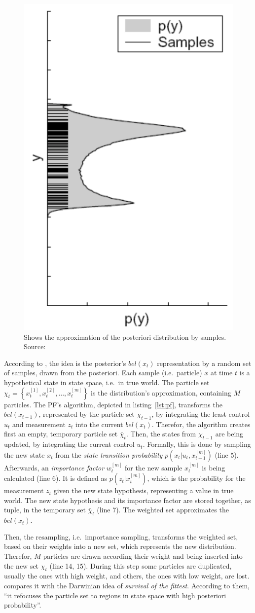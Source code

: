 \begin{figure}
	\includegraphics[height=0.45\textwidth]{figures/pf_approx}
	\caption{Shows the approximation of the posteriori distribution by samples. Source: \citep{thrun:prob_robo}}
	\label{fig:pf_approx}
\end{figure} 

According to \citet{thrun:prob_robo}, the idea is the posterior's $bel(x_t)$ representation by a random set of samples, drawn from the posteriori. Each sample (i.e.\ particle) $x$ at time $t$ is a hypothetical state in state space, i.e.\ in true world. The particle set $\chi_t = \left\{ x^{[1]}_t, x^{[2]}_t, \ldots, x^{[m]}_t \right\}$ is the distribution's approximation, containing $M$ particles. The \acs{PF}'s algorithm, depicted in listing~\ref{lst:pf}, transforms the $bel(x_{t-1})$, represented by the particle set $\chi_{t-1}$, by integrating the least control $u_t$ and measurement $z_t$ into the current $bel(x_t)$. Therefor, the algorithm creates first an empty, temporary particle set $\bar{\chi}_t$. Then, the states from $\chi_{t-1}$ are being updated, by integrating the current control $u_t$. Formally, this is done by sampling the new state $x_t$ from the \emph{state transition probability} $p(x_t|u_t, x^{[m]}_{t-1})$ (line 5). Afterwards, an \emph{importance factor} $w^{[m]}_t$ for the new sample $x^{[m]}_t$ is being calculated (line 6). It is defined as $p(z_t|x^{[m]}_t)$, which is the probability for the measurement $z_t$ given the new state hypothesis, representing a value in true world. The new state hypothesis and its importance factor are stored together, as tuple, in the temporary set $\bar{\chi}_t$ (line 7). The weighted set approximates the $bel(x_t)$.

Then, the resampling, i.e.\ importance sampling, transforms the weighted set, based on their weights into a new set, which represents the new distribution. Therefor, $M$ particles are drawn according their weight and being inserted into the new set $\chi_t$ (line 14, 15). During this step some particles are duplicated, usually the ones with high weight, and others, the ones with low weight, are lost. \citet{thrun:prob_robo} compares it with the Darwinian idea of \emph{survival of the fittest}. According to them, ``it refocuses the particle set to regions in state space with high posteriori probability''.
 
